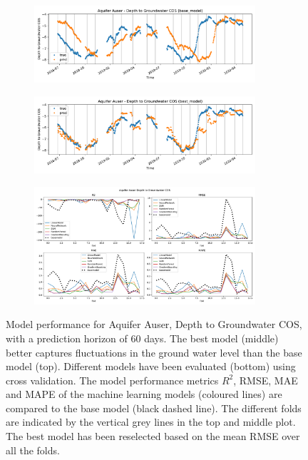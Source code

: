 \documentclass{article}
\begin{document}
\begin{figure}
     \centering
     \begin{subfigure}
         \centering
         \includegraphics[width=0.9\textwidth]{figs/Aquifer_Auser_Depth_to_Groundwater_COS_base_model.pdf}
     \end{subfigure}
% 
     \begin{subfigure}
         \centering
         \includegraphics[width=0.9\textwidth]{figs/Aquifer_Auser_Depth_to_Groundwater_COS_best_model.pdf}
     \end{subfigure}
%
     \begin{subfigure}
         \centering
         \includegraphics[width=0.9\textwidth]{figs/D60_pearson_Aquifer_Auser_Depth_to_Groundwater_COS_folds.pdf}
     \end{subfigure}
\caption{Model performance for Aquifer Auser, Depth to Groundwater COS, with a prediction horizon of 60 days. The best model (middle) better captures fluctuations in the ground water level than the base model (top). Different models have been evaluated (bottom) using cross validation. The model performance metrics $R^2$, RMSE, MAE and MAPE of the machine learning models (coloured lines) are compared to the base model (black dashed line). The different folds are indicated by the vertical grey lines in the top and middle plot. The best model has been reselected based on the mean RMSE over all the folds.}
\label{fig:auser_cos_models}
\end{figure}
\end{document}
